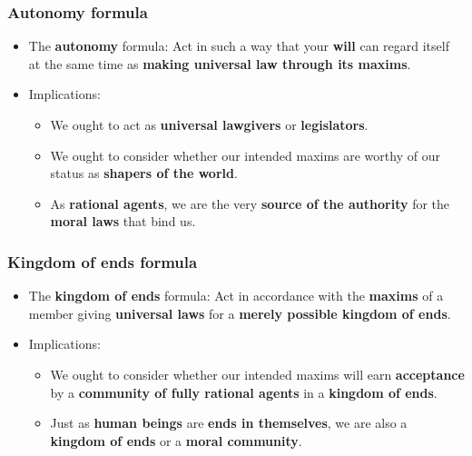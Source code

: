 \documentclass[11pt]{article}
\begin{document}
\subsubsection{Autonomy formula}
\label{sec:orgc1be04f}
\begin{itemize}
\item The \textbf{autonomy} formula:
Act in such a way that your \textbf{will} can regard itself at the same time as \textbf{making universal law through its maxims}.
\item Implications:
\begin{itemize}
\item We ought to act as \textbf{universal lawgivers} or \textbf{legislators}.
\item We ought to consider whether our intended maxims are worthy of our status as \textbf{shapers of the world}.
\item As \textbf{rational agents}, we are the very \textbf{source of the authority} for the \textbf{moral laws} that bind us.
\end{itemize}
\end{itemize}
\subsubsection{Kingdom of ends formula}
\label{sec:org31e7ad5}
\begin{itemize}
\item The \textbf{kingdom of ends} formula:
Act in accordance with the \textbf{maxims} of a member giving \textbf{universal laws} for a \textbf{merely possible kingdom of ends}.
\item Implications:
\begin{itemize}
\item We ought to consider whether our intended maxims will earn \textbf{acceptance} by a \textbf{community of fully rational agents} in a \textbf{kingdom of ends}.
\item Just as \textbf{human beings} are \textbf{ends in themselves}, we are also a \textbf{kingdom of ends} or a \textbf{moral community}.
\end{itemize}
\end{itemize}

 \newpage
\end{document}

